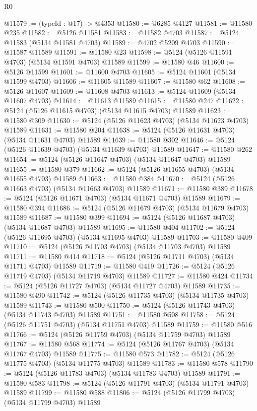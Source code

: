 \begin{lexlean}{R0}
\begin{coremodule}
@11579 := (typeId : @17) -> @4353
@11580 := @6285 @4127
@11581 := @11580 @235
@11582 := @5126 @11581
@11583 := @11582 @4703
@11587 := @5124 @11583 (@5134 @11581 @4703)
@11589 := @4702 @5209 @4703
@11590 := @11587 @11589
@11591 := @11580 @23
@11598 := @5124 (@5126 @11591 @4703) (@5134 @11591 @4703) @11589
@11599 := @11580 @46
@11600 := @5126 @11599
@11601 := @11600 @4703
@11605 := @5124 @11601 (@5134 @11599 @4703)
@11606 := @11605 @11589
@11607 := @11580 @62
@11608 := @5126 @11607
@11609 := @11608 @4703
@11613 := @5124 @11609 (@5134 @11607 @4703)
@11614 := @11613 @11589
@11615 := @11580 @247
@11622 := @5124 (@5126 @11615 @4703) (@5134 @11615 @4703) @11589
@11623 := @11580 @309
@11630 := @5124 (@5126 @11623 @4703) (@5134 @11623 @4703) @11589
@11631 := @11580 @204
@11638 := @5124 (@5126 @11631 @4703) (@5134 @11631 @4703) @11589
@11639 := @11580 @302
@11646 := @5124 (@5126 @11639 @4703) (@5134 @11639 @4703) @11589
@11647 := @11580 @262
@11654 := @5124 (@5126 @11647 @4703) (@5134 @11647 @4703) @11589
@11655 := @11580 @379
@11662 := @5124 (@5126 @11655 @4703) (@5134 @11655 @4703) @11589
@11663 := @11580 @384
@11670 := @5124 (@5126 @11663 @4703) (@5134 @11663 @4703) @11589
@11671 := @11580 @389
@11678 := @5124 (@5126 @11671 @4703) (@5134 @11671 @4703) @11589
@11679 := @11580 @394
@11686 := @5124 (@5126 @11679 @4703) (@5134 @11679 @4703) @11589
@11687 := @11580 @399
@11694 := @5124 (@5126 @11687 @4703) (@5134 @11687 @4703) @11589
@11695 := @11580 @404
@11702 := @5124 (@5126 @11695 @4703) (@5134 @11695 @4703) @11589
@11703 := @11580 @409
@11710 := @5124 (@5126 @11703 @4703) (@5134 @11703 @4703) @11589
@11711 := @11580 @414
@11718 := @5124 (@5126 @11711 @4703) (@5134 @11711 @4703) @11589
@11719 := @11580 @419
@11726 := @5124 (@5126 @11719 @4703) (@5134 @11719 @4703) @11589
@11727 := @11580 @424
@11734 := @5124 (@5126 @11727 @4703) (@5134 @11727 @4703) @11589
@11735 := @11580 @490
@11742 := @5124 (@5126 @11735 @4703) (@5134 @11735 @4703) @11589
@11743 := @11580 @500
@11750 := @5124 (@5126 @11743 @4703) (@5134 @11743 @4703) @11589
@11751 := @11580 @508
@11758 := @5124 (@5126 @11751 @4703) (@5134 @11751 @4703) @11589
@11759 := @11580 @516
@11766 := @5124 (@5126 @11759 @4703) (@5134 @11759 @4703) @11589
@11767 := @11580 @568
@11774 := @5124 (@5126 @11767 @4703) (@5134 @11767 @4703) @11589
@11775 := @11580 @573
@11782 := @5124 (@5126 @11775 @4703) (@5134 @11775 @4703) @11589
@11783 := @11580 @578
@11790 := @5124 (@5126 @11783 @4703) (@5134 @11783 @4703) @11589
@11791 := @11580 @583
@11798 := @5124 (@5126 @11791 @4703) (@5134 @11791 @4703) @11589
@11799 := @11580 @588
@11806 := @5124 (@5126 @11799 @4703) (@5134 @11799 @4703) @11589

\end{coremodule}
\end{lexlean}
